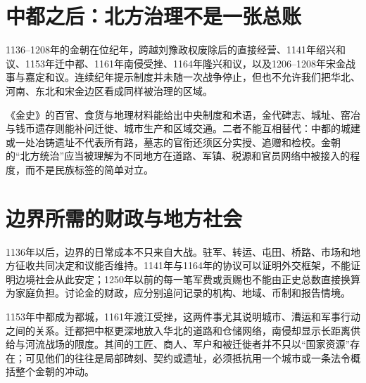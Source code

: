 \section{中都之后：北方治理不是一张总账}

1136--1208年的金朝在位纪年，跨越刘豫政权废除后的直接经营、1141年绍兴和议、1153年迁中都、1161年南侵受挫、1164年隆兴和议，以及1206--1208年宋金战事与嘉定和议。连续纪年提示制度并未随一次战争停止，但也不允许我们把华北、河南、东北和宋金边区看成同样被治理的区域。

《金史》的百官、食货与地理材料能给出中央制度和术语，金代碑志、城址、窑冶与钱币遗存则能补问迁徙、城市生产和区域交通。二者不能互相替代：中都的城建或一处冶铸遗址不代表所有路，墓志的官衔还须区分实授、追赠和检校。金朝的“北方统治”应当被理解为不同地方在道路、军镇、税源和官员网络中被接入的程度，而不是民族标签的简单对立。

\section{边界所需的财政与地方社会}

1136年以后，边界的日常成本不只来自大战。驻军、转运、屯田、桥路、市场和地方征收共同决定和议能否维持。1141年与1164年的协议可以证明外交框架，不能证明边境社会从此安定；1250年以前的每一笔军费或贡赐也不能由正史总数直接换算为家庭负担。讨论金的财政，应分别追问记录的机构、地域、币制和报告情境。

1153年中都成为都城，1161年渡江受挫，这两件事尤其说明城市、漕运和军事行动之间的关系。迁都把中枢更深地放入华北的道路和仓储网络，南侵却显示长距离供给与河流战场的限度。其间的工匠、商人、军户和被迁徙者并不只以“国家资源”存在；可见他们的往往是局部碑刻、契约或遗址，必须抵抗用一个城市或一条法令概括整个金朝的冲动。
